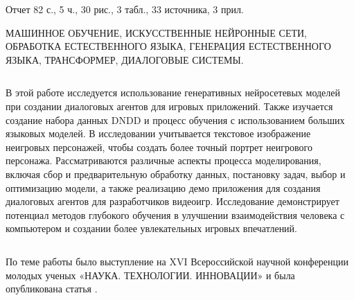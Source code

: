 Отчет 82 с., 5 ч., 30 рис., 3 табл., 33 источника, 3 прил.

МАШИННОЕ ОБУЧЕНИЕ, ИСКУССТВЕННЫЕ НЕЙРОННЫЕ СЕТИ, ОБРАБОТКА ЕСТЕСТВЕННОГО ЯЗЫКА, ГЕНЕРАЦИЯ ЕСТЕСТВЕННОГО ЯЗЫКА, ТРАНСФОРМЕР, ДИАЛОГОВЫЕ СИСТЕМЫ.

$ $

В этой работе исследуется использование генеративных нейросетевых моделей при создании диалоговых агентов для игровых приложений. Также изучается создание набора данных DNDD и процесс обучения с использованием больших языковых моделей. В исследовании учитывается текстовое изображение неигровых персонажей, чтобы создать более точный портрет неигрового персонажа. Рассматриваются различные аспекты процесса моделирования, включая сбор и предварительную обработку данных, постановку задач, выбор и оптимизацию модели, а также реализацию демо приложения для создания диалоговых агентов для разработчиков видеоигр. Исследование демонстрирует потенциал методов глубокого обучения в улучшении взаимодействия человека с компьютером и создании более увлекательных игровых впечатлений.

$ $

По теме работы было выступление на XVI Всероссийской научной конференции молодых ученых «НАУКА. ТЕХНОЛОГИИ. ИННОВАЦИИ» и была опубликована статья \cite{nti-paper}.